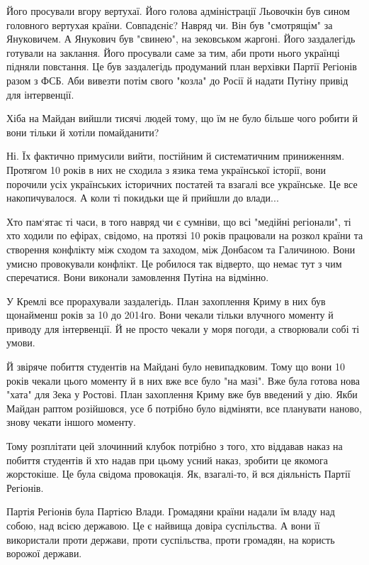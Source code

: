 \begin{itemize}
Його просували вгору вертухаї. Його голова адміністрації Льовочкін був сином
головного вертухая країни. Совпадєніє? Навряд чи. Він був "смотрящім" за
Януковичем. А Янукович був "свинею", на зековськом жаргоні. Його заздалегідь
готували на заклання. Його просували саме за тим, аби проти нього українці
підняли повстання. Це був заздалегідь продуманий план верхівки Партії Регіонів
разом з ФСБ. Аби вивезти потім свого "козла" до Росії й надати Путіну привід
для інтервенції.

Хіба на Майдан вийшли тисячі людей тому, що їм не було більше чого робити й
вони тільки й хотіли помайданити?

Ні. Їх фактично примусили вийти, постійним й систематичним приниженням.
Протягом 10 років в них не сходила з язика тема української історії, вони
порочили усіх українських історичних постатей та взагалі все українське. Це все
накопичувалося. А коли ті покидьки ще й прийшли до влади...

Хто пам`ятає ті часи, в того навряд чи є сумніви, що всі "медійні регіонали",
ті хто ходили по ефірах, свідомо, на протязі 10 років працювали на розкол
країни та створення конфлікту між сходом та заходом, між Донбасом та Галичиною.
Вони умисно провокували конфлікт. Це робилося так відверто, що немає тут з чим
сперечатися. Вони виконали замовлення Путіна на відмінно.

У Кремлі все прорахували заздалегідь. План захоплення Криму в них був щонайменш
років за 10 до 2014го. Вони чекали тільки влучного моменту й приводу для
інтервенції. Й не просто чекали у моря погоди, а створювали собі ті умови.

Й звіряче побиття студентів на Майдані було невипадковим. Тому що вони 10 років
чекали цього моменту й в них вже все було "на мазі". Вже була готова нова
"хата" для Зека у Ростові. План захоплення Криму вже був введений у дію. Якби
Майдан раптом розійшовся, усе б потрібно було відміняти, все планувати наново,
знову чекати іншого моменту.

Тому розплітати цей злочинний клубок потрібно з того, хто віддавав наказ на
побиття студентів й хто надав при цьому усний наказ, зробити це якомога
жорстокіше. Це була свідома провокація. Як, взагалі-то, й вся діяльність Партії
Регіонів.

Партія Регіонів була Партією Влади. Громадяни країни надали їм владу над собою,
над всією державою. Це є найвища довіра суспільства. А вони її використали
проти держави, проти суспільства, проти громадян, на користь ворожої держави.


\end{itemize}
